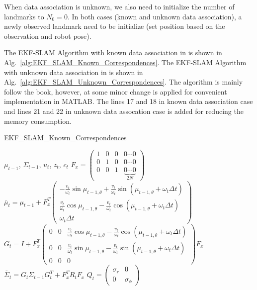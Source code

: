 \documentclass[conference]{IEEEtran}
\begin{document}
When data association is unknown, we also need to initialize the number of landmarks to $N_{0}=0$. In both cases (known and unknown data association), a newly observed landmark need to be initialize (set position based on the observation and robot pose).
\par The EKF-SLAM Algorithm with known data association in \cite{Probabilistic_Robotics} is shown in Alg.~\ref{alg:EKF_SLAM_Known_Correspondences}. The EKF-SLAM Algorithm with unknown data association in \cite{Probabilistic_Robotics} is shown in Alg.~\ref{alg:EKF_SLAM_Unknown_Correspondences}. The algorithm is mainly follow the book, however, at some minor change is applied for convenient implementation in MATLAB. The lines 17 and 18 in known data association case and lines 21 and 22 in unknown data assocation case is added for reducing the memory consumption.
\begin{algorithm}[htbp]
	\caption{EKF\_SLAM\_Known\_Correspondences}
	\label{alg:EKF_SLAM_Known_Correspondences}
	\scriptsize
	\begin{algorithmic}[1]
		\Require $\mu_{t-1}$, $\Sigma_{t-1}$, $u_{t}$, $z_{t}$, $c_{t}$
		\State $F_{x} = \begin{pmatrix} 1 & 0 & 0 & 0 \cdots 0 \\ 0 & 1 & 0 & 0 \cdots 0 \\ 0 & 0 & 1 & \underbrace{0 \cdots 0}_{2N} \end{pmatrix}$
		\State $\bar{\mu}_{t} = \mu_{t-1} + F_{x}^{T} \begin{pmatrix} -\frac{v_{t}}{\omega_{t}}\sin{\mu_{t-1,\theta}} + \frac{v_{t}}{\omega_{t}}\sin(\mu_{t-1,\theta}+\omega_{t}\Delta{t}) \\ \frac{v_{t}}{\omega_{t}}\cos{\mu_{t-1,\theta}} - \frac{v_{t}}{\omega_{t}}\cos(\mu_{t-1,\theta}+\omega_{t}\Delta{t}) \\ \omega_{t}\Delta{t} \end{pmatrix}$
		\State $G_{t} = I + F_{x}^{T} \begin{pmatrix} 0 & 0 & \frac{v_{t}}{\omega_{t}}\cos{\mu_{t-1,\theta}} - \frac{v_{t}}{\omega_{t}}\cos(\mu_{t-1,\theta}+\omega_{t}\Delta{t}) \\ 0 & 0 & \frac{v_{t}}{\omega_{t}}\sin{\mu_{t-1,\theta}} - \frac{v_{t}}{\omega_{t}}\sin(\mu_{t-1,\theta}+\omega_{t}\Delta{t}) \\ 0 & 0 & 0 \end{pmatrix} F_{x}$
		\State $\bar{\Sigma}_{t} = G_{t}\Sigma_{t-1}G_{t}^{T} + F_{x}^{T}R_{t}F_{x}$
		\State $Q_{t} = \begin{pmatrix} \sigma_{r} & 0 \\ 0 & \sigma_{\phi} \end{pmatrix}$

\end{algorithmic}
\end{algorithm}
\end{document}
